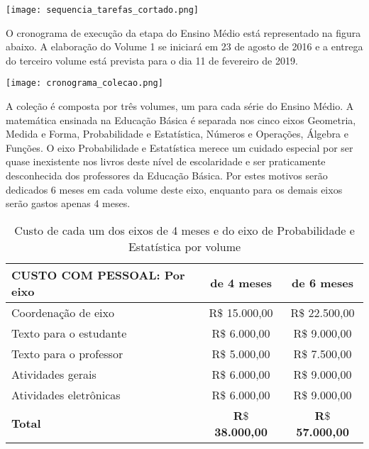\documentclass[10 pt]{article}
\begin{document}
\noindent\texttt{[image: sequencia\_tarefas\_cortado.png]}

O cronograma de execução da etapa do Ensino Médio está representado na figura abaixo. A elaboração do Volume 1 se iniciará em 23 de agosto de 2016 e a entrega do terceiro volume está prevista para o dia 11 de fevereiro de 2019.

\noindent\texttt{[image: cronograma\_colecao.png]}
\vspace{0.2 cm}

A coleção é composta por três volumes, um para cada série do Ensino Médio. A matemática ensinada na Educação Básica é separada nos cinco eixos  Geometria, Medida e Forma, Probabilidade e Estatística, Números e Operações, Álgebra e Funções. O eixo Probabilidade e Estatística merece um cuidado especial por ser quase inexistente nos livros deste nível de escolaridade e ser praticamente desconhecida dos professores da Educação Básica. Por estes motivos serão dedicados 6 meses em cada volume deste eixo, enquanto para os demais eixos serão gastos apenas 4 meses.
\clearpage

\vspace{0.2 cm}

\begin{table}[h] \label{tab por eixo}
  \begin{center}
\begin{tabular}[h!]{|l|c|c|}
   \hline
\bf CUSTO COM PESSOAL: Por eixo & de 4 meses &  de 6 meses \\
   \hline
   Coordenação de eixo & R$\$$ 15.000,00 & R$\$$ 22.500,00\\
   \hline
   Texto para o estudante & R$\$$ 6.000,00 & R$\$$ 9.000,00\\
   \hline
   Texto para o professor & R$\$$ 5.000,00 & R$\$$ 7.500,00\\
   \hline
   Atividades gerais & R$\$$ 6.000,00 & R$\$$ 9.000,00\\
   \hline
   Atividades eletrônicas & R$\$$ 6.000,00  & R$\$$ 9.000,00\\
   \hline
   {\bf Total} & {\bf R$\$$ 38.000,00} &  {\bf R$\$$ 57.000,00}\\
   \hline
\end{tabular}
  \end{center}
  \caption{Custo de cada um dos eixos de 4 meses e do eixo de Probabilidade e Estatística por volume}
 \end{table}
 
\end{document}
